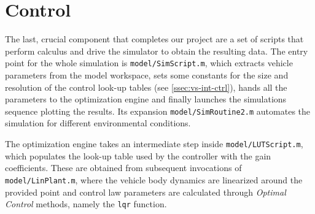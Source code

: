 	\section{Control}
	\label{sec:vs-ctrl}

	The last, crucial component that completes our project are a set of scripts that perform calculus and drive the simulator to obtain the resulting data.
	The entry point for the whole simulation is \texttt{model/SimScript.m}, which extracts vehicle parameters from the model workspace, sets some constants for the size and
	resolution of the control look-up tables (see \ref{ssec:vs-int-ctrl}), hands all the parameters to the optimization engine and finally launches the simulations sequence plotting
	the results. Its expansion \texttt{model/SimRoutine2.m} automates the simulation for different environmental conditions.
	
	The optimization engine takes an intermediate step inside \texttt{model/LUTScript.m}, which populates the look-up table used by the controller with the gain coefficients.
	These are obtained from subsequent invocations of \texttt{model/LinPlant.m}, where the vehicle body dynamics are linearized around the provided point and control law
	parameters are calculated through \emph{Optimal Control} methods, namely the \lstinline{lqr} \mwML{} function.